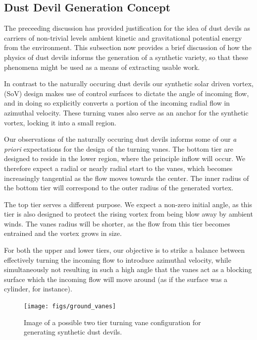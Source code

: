 \subsection{Dust Devil Generation Concept}

The preceeding discussion has provided justification for the idea of
dust devils as carriers of non-trivial levels ambient kinetic and
gravitational potential energy from the environment. This  
subsection now provides a brief discussion of how the physics of 
dust devils informs the generation of a synthetic variety, so that these
phenomena might be used as a means of extracting usable work. 

In contrast to the naturally occuring dust devils
our synthetic solar driven vortex, (SoV) design makes use of
control surfaces to dictate the angle of incoming flow, and in doing so
explicitly converts a portion of the incoming radial flow in azimuthal
velocity. These turning vanes also serve as an anchor for the synthetic
vortex, locking it into a small region.   

Our observations of the naturally occuring dust devils informs some of
our \textit{a priori} expectations for the design of the turning
vanes. The bottom tier are designed to reside in the lower region, where
the principle inflow will occur. We therefore expect a radial or nearly
radial start to the vanes, which becomes increasingly tangential as the
flow moves towards the center. The inner radius of the bottom tier will
correspond to the outer radius of the generated vortex. 

The top tier serves a different purpose. We expect a non-zero initial
angle, as this tier is also designed to protect the rising vortex from
being blow away by ambient winds. The vanes radius will be shorter, as
the flow from this tier becomes entrained and the vortex grows in
size. 

For both the upper and lower tiers, our objective is to strike a balance
between effectively turning the incoming flow to introduce azimuthal
velocity, while simultaneously not resulting in such a high angle that
the vanes act as a blocking surface which the incoming flow will move
around (as if the surface was a cylinder, for instance). 

  \begin{figure}[!htb]
    \begin{center}
     \texttt{[image: figs/ground\_vanes]}
     \caption{Image of a possible two tier turning vane 
       configuration for generating synthetic dust devils.}
     \label{fig:cartoon}
    \end{center}
  \end{figure}


